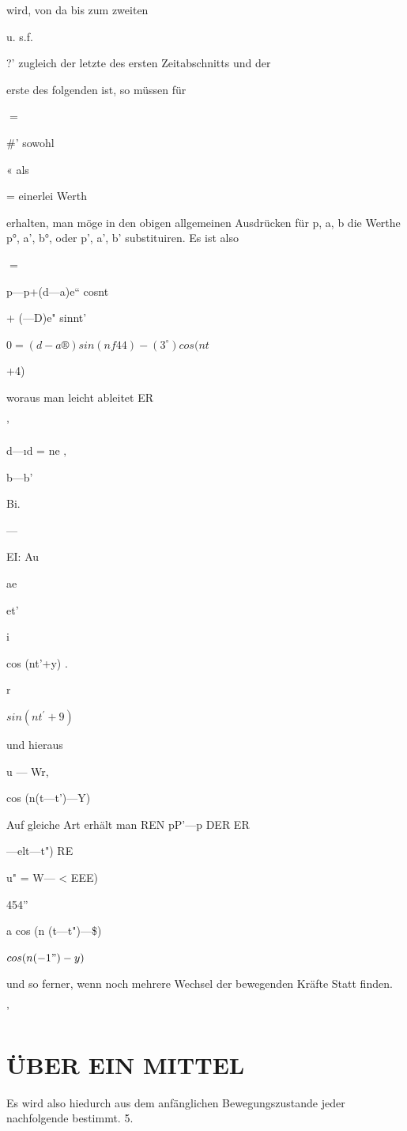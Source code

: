 \documentclass[12pt,a4paper]{article}
\begin{document}
wird, von da bis zum zweiten

u. s.f.

?' zugleich der letzte des ersten Zeitabschnitts und der

erste des folgenden ist, so müssen für

$=$

\#’ sowohl

« als

= einerlei Werth

erhalten, man möge in den obigen allgemeinen Ausdrücken für p, a, b die Werthe p°, a’, b°, oder p', a’, b' substituiren. Es ist also

$=$

p—p+(d—a)e“ cosnt

+ (—D)e" sinnt'

$0 = (d-a®) sin (nf 44) - (3^{\circ}) cos(nt$

+4)

woraus man leicht ableitet ER

’

d—ıd = ne ‚

b—b'

Bi.

—

EI: Au

ae

et’

i

cos (nt'+y) .

r

$sin (nt^{\prime}+ 9)$

und hieraus

u — Wr,

cos (n(t—t')—Y)

Auf gleiche Art erhält man REN pP’—p DER ER

—elt—t") RE

u" = W— < EEE)

454”

a cos (n (t—t")—\$)

$cos (n(- 1")-y)$

und so ferner, wenn noch mehrere Wechsel der bewegenden Kräfte Statt finden.

’

\section*{ÜBER EIN MITTEL}
Es wird also hiedurch aus dem anfänglichen Bewegungszustande jeder nachfolgende bestimmt. 5.
\end{document}
